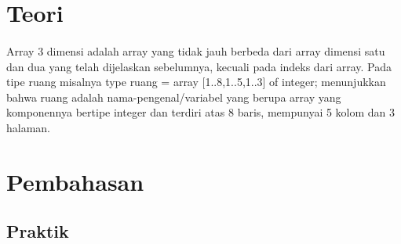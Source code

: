 \documentclass[a4paper,12pt]{article}
\begin{document}
\section{Teori}
\paragraph{}
Array 3 dimensi adalah array yang tidak jauh berbeda dari array
dimensi satu dan dua yang telah dijelaskan sebelumnya, kecuali pada indeks
dari array. Pada tipe ruang misalnya type ruang = array [1..8,1..5,1..3] of
integer; menunjukkan bahwa ruang adalah nama-pengenal/variabel yang
berupa array yang komponennya bertipe integer dan terdiri atas 8 baris,
mempunyai 5 kolom dan 3 halaman.

\newpage

\section{Pembahasan}
\subsection{Praktik}
\end{document}

